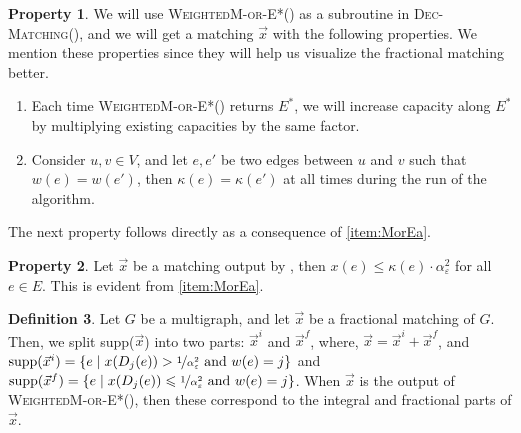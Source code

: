 \documentclass[a4paper,11pt]{article}
\newcommand{\set}[1]{\ensuremath{\left\{ #1 \right\}}}
\newcommand{\eps}{\varepsilon}
\theoremstyle{definition}
\newtheorem{definition2}{Definition}
\theoremstyle{definition}
\theoremstyle{definition}
\newtheorem{property}[definition2]{Property}
\theoremstyle{definition}
\theoremstyle{definition}
\theoremstyle{definition}
\theoremstyle{definition}
\theoremstyle{definition}
\theoremstyle{definition}
\theoremstyle{definition}
\theoremstyle{definition}
\theoremstyle{definition}
\theoremstyle{definition}
\theoremstyle{definition}
\theoremstyle{definition}
\begin{document}
\begin{property}
We will use \textsc{WeightedM-or-E*}() as a subroutine in \textsc{Dec-Matching}(), and we will get a matching $\vec{x}$ with the following properties. We mention these properties since they will help us visualize the fractional matching better. 
\begin{enumerate}
\item Each time \textsc{WeightedM-or-E*}() returns $E^*$, we will increase capacity along $E^*$ by multiplying existing capacities by the same factor.
\item Consider $u,v\in V$, and let $e,e'$ be two edges between $u$ and $v$ such that $w(e)=w(e')$, then $\kappa(e)=\kappa(e')$ at all times during the run of the algorithm. 
\end{enumerate}
\end{property}
 The next property follows directly as a consequence of \ref{item:MorEa}.
 
 \begin{property}\label{prop:excessflow}
Let $\vec{x}$ be a matching output by , then $x(e)\leqslant \kappa(e)\cdot \alpha_{\eps}^2$ for all $e\in E$. This is evident from \ref{item:MorEa}.
 \end{property}
 
 \begin{definition2}
 Let $G$ be a multigraph, and let $\vec{x}$ be a fractional matching of $G$. Then, we split supp($\vec{x}$) into two parts: $\vec{x}^i$ and $\vec{x}^f$, where, $\vec{x}=\vec{x}^i+\vec{x}^f$, and $\text{supp}(\vec{x}^i)=\set{e\mid x(D_j(e))>\nicefrac{1}{\alpha_{\eps}^2}\text{ and }w(e)=j}$ and $\text{supp}(\vec{x}^f)=\set{e\mid x(D_j(e))\leqslant \nicefrac{1}{\alpha_{\eps}^2}\text{ and }w(e)=j}$. When $\vec{x}$ is the output of \textsc{WeightedM-or-E*}(), then these correspond to the integral and fractional parts of $\vec{x}$. 
 \end{definition2}
 
\end{document}
